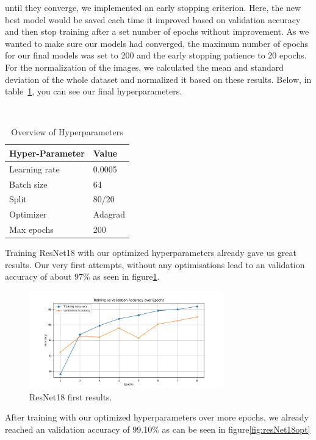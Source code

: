 until they converge, we implemented an early stopping criterion. Here, the new best model would be saved each time it improved based on validation accuracy and then stop training after a set number of epochs without improvement. As we wanted to make sure our models had converged, the maximum number of epochs for our final models was set to 200 and the early stopping patience to 20 epochs. For the normalization of the images, we calculated the mean and standard deviation of the whole dataset and normalized it based on these results. Below, in table~\ref{tab:hyperparameters}, you can see our final hyperparameters.


\begin{table}[h]
    \caption{Overview of Hyperparameters}~\label{tab:hyperparameters}
    \centering
    \begin{tabular}{ll}
    \toprule
    \textbf{Hyper-Parameter} & \textbf{Value} \\
    \midrule
    Learning rate & 0.0005 \\
    Batch size & 64 \\
    Split & 80/20 \\
    Optimizer & Adagrad \\
    Max epochs & 200 \\
    \bottomrule
    \end{tabular}
\end{table} 


\label{ResNet18}
Training ResNet18 with our optimized hyperparameters already gave us great results. Our very first attempts, without any optimisations lead to an validation accuracy of about 97\% as seen in figure\ref{fig:resNet18first}.
\begin{figure}[ht]
    \centering
    \includegraphics[width=0.75\textwidth]{figures/Resnet18_8_epochs.png}
    \caption{ResNet18 first results.}\label{fig:resNet18first}
\end{figure}

After training with our optimized hyperparameters over more epochs, we already reached an validation accuracy of 99.10\% as can be seen in figure\ref{fig:resNet18opt}

